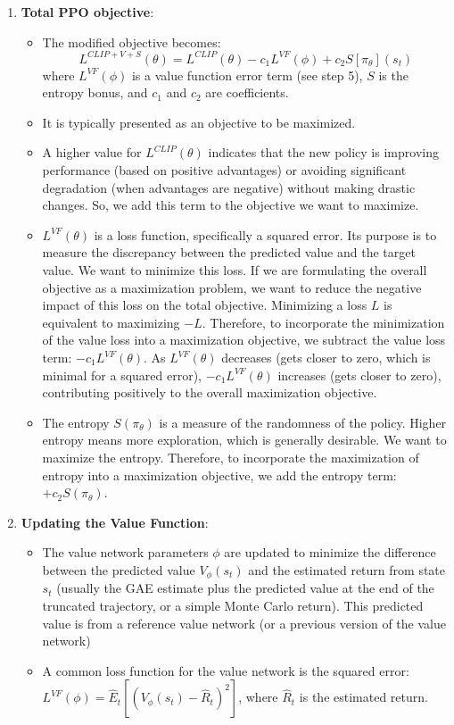 \documentclass[10pt,a4paper]{report}
\begin{document}
\begin{enumerate}
\begin{itemize}
\end{itemize}
\item    \textbf{Total PPO objective}:
\begin{itemize}
	\item  The modified objective becomes: $$L^{CLIP+V+S}(\theta) = L^{CLIP}(\theta) - c_1 L^{VF}(\phi) + c_2 S[\pi_\theta](s_t)$$ where $L^{VF}(\phi)$ is a value function error term (see step 5), $S$ is the entropy bonus, and $c_1$ and $c_2$ are coefficients.
	\item It is typically presented as an objective to be maximized.
	\item A higher value for $L^{CLIP}(\theta)$ indicates that the new policy is improving performance (based on positive advantages) or avoiding significant degradation (when advantages are negative) without making drastic changes. So, we add this term to the objective we want to maximize.
	\item $L^{VF}(\theta)$ is a loss function, specifically a squared error. Its purpose is to measure the discrepancy between the predicted value and the target value. We want to minimize this loss. If we are formulating the overall objective as a maximization problem, we want to reduce the negative impact of this loss on the total objective. Minimizing a loss $L$ is equivalent to maximizing $-L$. Therefore, to incorporate the minimization of the value loss into a maximization objective, we subtract the value loss term: $-c_1 L^{VF}(\theta)$. As $L^{VF}(\theta)$ decreases (gets closer to zero, which is minimal for a squared error), $-c_1 L^{VF}(\theta)$ increases (gets closer to zero), contributing positively to the overall maximization objective.
	\item The entropy $S(\pi_\theta)$ is a measure of the randomness of the policy. Higher entropy means more exploration, which is generally desirable. We want to maximize the entropy. Therefore, to incorporate the maximization of entropy into a maximization objective, we add the entropy term: $+c_2 S(\pi_\theta)$.

\end{itemize}

\item    \textbf{Updating the Value Function}:
\begin{itemize}
\item         The value network parameters $\phi$ are updated to minimize the difference between the predicted value $V_\phi(s_t)$ and the estimated return from state $s_t$ (usually the GAE estimate plus the predicted value at the end of the truncated trajectory, or a simple Monte Carlo return). This predicted value is from a reference value network (or a previous version of the value network)
\item         A common loss function for the value network is the squared error: $L^{VF}(\phi) = \hat{E}_t [(V_\phi(s_t) - \hat{R}_t)^2]$, where $\hat{R}_t$ is the estimated return.
\end{itemize}


\end{enumerate}
\end{document}
